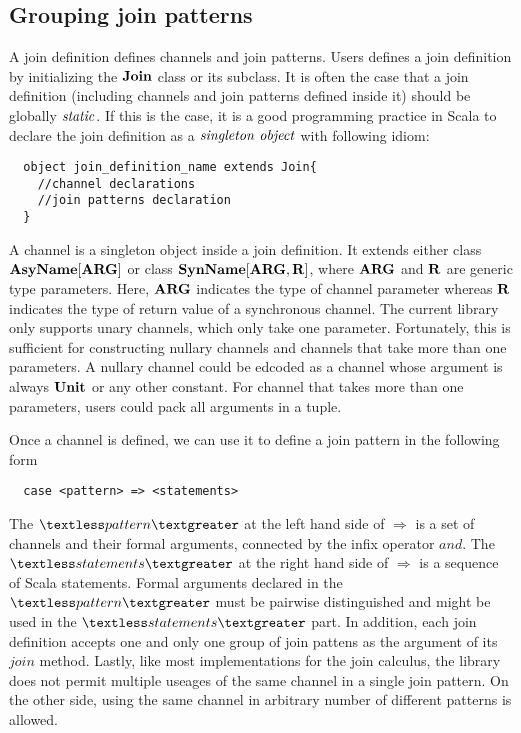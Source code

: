 \subsection{Grouping join patterns}

A join definition defines channels and join patterns.  Users defines a join definition by initializing the $\bf{Join}$ class or its subclass.  It is often the case that a join definition (including channels and join patterns defined inside it) should be globally $\it{static}$.  If this is the case, it is a good programming practice in Scala to declare the join definition as a $\it{singleton\ object}$ with following idiom:

\begin{lstlisting}
  object join_definition_name extends Join{
    //channel declarations
    //join patterns declaration
  }
\end{lstlisting}

A channel is a singleton object inside a join definition.  It extends either class $\bf{AsyName[ARG]}$ or class $\bf{SynName[ARG,R]}$, where $\bf{ARG}$ and $\bf{R}$ are generic type parameters.  Here, $\bf{ARG}$ indicates the type of channel parameter whereas $\bf{R}$ indicates the type of return value of a synchronous channel.  The current library only supports unary channels, which only take one parameter.  Fortunately, this is sufficient for constructing nullary channels and channels that take more than one parameters.  A nullary channel could be edcoded as a channel whose argument is always $\bf{Unit}$ or any other constant.  For channel that takes more than one parameters, users could pack all arguments in a tuple.

Once a channel is defined, we can use it to define a join pattern in the following form
\begin{lstlisting}
  case <pattern> => <statements>
\end{lstlisting}

\newpage

The $\textless pattern \textgreater$ at the left hand side of $\Rightarrow$ is a set of channels and their formal arguments, connected by the infix operator $and$.  The  $\textless statements \textgreater$ at the right hand side of $\Rightarrow$ is a sequence of Scala statements.  Formal arguments declared in the  $\textless pattern \textgreater$ must be pairwise distinguished and might be used in the  $\textless statements \textgreater$ part.  In addition, each join definition accepts one and only one group of join pattens as the argument of its $join$ method.  Lastly, like most implementations for the join calculus, the library does not permit multiple useages of the same channel in a single join pattern.  On the other side, using the same channel in arbitrary number of different patterns is allowed.

